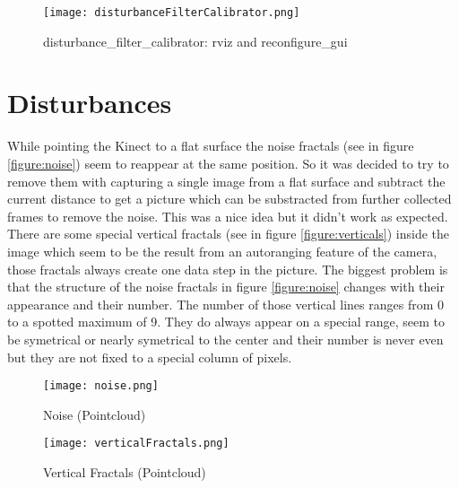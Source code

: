 \begin{figure}[htp]
\begin{center}
  \texttt{[image: disturbanceFilterCalibrator.png]}
  \caption{disturbance\_filter\_calibrator: rviz and reconfigure\_gui}
  \label{figure:distFilCal}
\end{center}
\end{figure}

\section{Disturbances}
While pointing the Kinect to a flat surface the noise fractals (see in figure \vref{figure:noise}) 
seem to reappear at the same position. So it was decided to try to remove them with capturing a single image 
from a flat surface and subtract the current distance to get a picture which can be substracted from further collected
frames to remove the noise. This was a nice idea but it didn't work as expected. 
There are some special vertical fractals (see in figure \vref{figure:verticals}) 
inside the image which seem to be the result from an autoranging feature of the camera, those fractals
always create one data step in the picture. The biggest problem is that the structure of the noise fractals
in figure \vref{figure:noise} changes with their appearance and their number. 
The number of those vertical lines ranges from 0 to a spotted maximum of 9. 
They do always appear on a special range, seem to be symetrical or 
nearly symetrical to the center and their number is never even but they are not fixed to a special column of pixels. 
\begin{figure}[htp]
\begin{center}
  \texttt{[image: noise.png]}
  \caption{Noise (Pointcloud)}
  \label{figure:noise}
\end{center}
\end{figure}

\begin{figure}[htp]
\begin{center}
  \texttt{[image: verticalFractals.png]}
  \caption{Vertical Fractals (Pointcloud)}
  \label{figure:verticals}
\end{center}
\end{figure}

